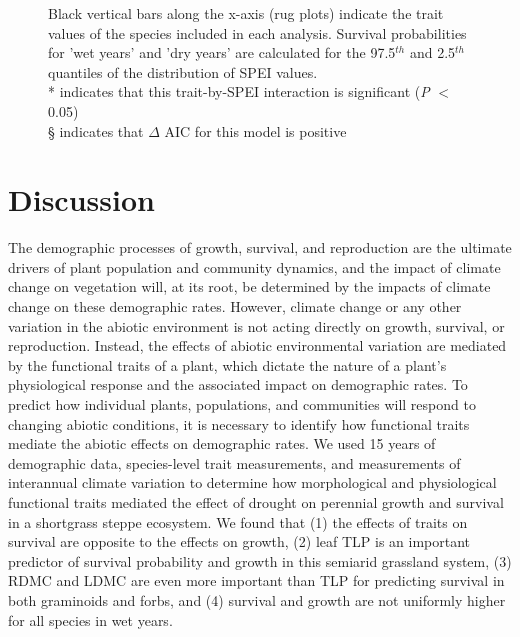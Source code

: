 \documentclass[12pt, letterpaper]{article}
\begin{document}
\begin{figure}
{Black vertical bars along the x-axis (rug plots) indicate the trait values of the species included in each analysis. Survival probabilities for 'wet years' and 'dry years' are calculated for the 97.5$^{th}$ and 2.5$^{th}$ quantiles of the distribution of SPEI values. \\
* indicates that this trait-by-SPEI interaction is significant (\textit{P} $<$ 0.05)\\
§ indicates that $\Delta$ AIC for this model is positive
}
 \label{fig:test}
\end{figure}

\section{Discussion}
The demographic processes of growth, survival, and reproduction are the ultimate drivers of plant population and community dynamics, and the impact of climate change on vegetation will, at its root, be determined by the impacts of climate change on these demographic rates. However, climate change or any other variation in the abiotic environment is not acting directly on growth, survival, or reproduction. Instead, the effects of abiotic environmental variation are mediated by the functional traits of a plant, which dictate the nature of a plant's physiological response and the associated impact on demographic rates. To predict how individual plants, populations, and communities will respond to changing abiotic conditions, it is necessary to identify how functional traits mediate the abiotic effects on demographic rates. We used 15 years of demographic data, species-level trait measurements, and measurements of interannual climate variation to determine how morphological and physiological functional traits mediated the effect of drought on perennial growth and survival in a shortgrass steppe ecosystem. We found that (1) the effects of traits on survival are opposite to the effects on growth, (2) leaf TLP is an important predictor of survival probability and growth in this semiarid grassland system, (3) RDMC and LDMC are even more important than TLP for predicting survival in both graminoids and forbs, and (4) survival and growth are not uniformly higher for all species in wet years. 
\end{document}
